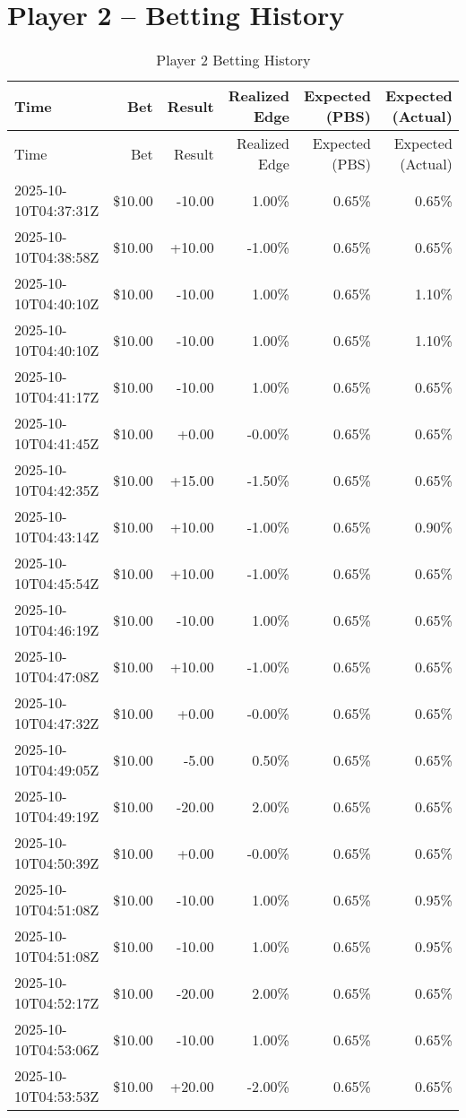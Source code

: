 \documentclass[11pt]{article}
\begin{document}
\section*{Player 2 -- Betting History}
\begin{longtable}{l | r | r | r | r | r}
\caption{Player 2 Betting History}\label{tab:history\_p2}\\
\hline
Time & Bet & Result & Realized Edge & Expected (PBS) & Expected (Actual) \\ \hline
\endfirsthead
\hline
Time & Bet & Result & Realized Edge & Expected (PBS) & Expected (Actual) \\ \hline
\endhead
2025-10-10T04:37:31Z & \$10.00 & -10.00 & 1.00\% & 0.65\% & 0.65\% \\
2025-10-10T04:38:58Z & \$10.00 & +10.00 & -1.00\% & 0.65\% & 0.65\% \\
2025-10-10T04:40:10Z & \$10.00 & -10.00 & 1.00\% & 0.65\% & 1.10\% \\
2025-10-10T04:40:10Z & \$10.00 & -10.00 & 1.00\% & 0.65\% & 1.10\% \\
2025-10-10T04:41:17Z & \$10.00 & -10.00 & 1.00\% & 0.65\% & 0.65\% \\
2025-10-10T04:41:45Z & \$10.00 & +0.00 & -0.00\% & 0.65\% & 0.65\% \\
2025-10-10T04:42:35Z & \$10.00 & +15.00 & -1.50\% & 0.65\% & 0.65\% \\
2025-10-10T04:43:14Z & \$10.00 & +10.00 & -1.00\% & 0.65\% & 0.90\% \\
2025-10-10T04:45:54Z & \$10.00 & +10.00 & -1.00\% & 0.65\% & 0.65\% \\
2025-10-10T04:46:19Z & \$10.00 & -10.00 & 1.00\% & 0.65\% & 0.65\% \\
2025-10-10T04:47:08Z & \$10.00 & +10.00 & -1.00\% & 0.65\% & 0.65\% \\
2025-10-10T04:47:32Z & \$10.00 & +0.00 & -0.00\% & 0.65\% & 0.65\% \\
2025-10-10T04:49:05Z & \$10.00 & -5.00 & 0.50\% & 0.65\% & 0.65\% \\
2025-10-10T04:49:19Z & \$10.00 & -20.00 & 2.00\% & 0.65\% & 0.65\% \\
2025-10-10T04:50:39Z & \$10.00 & +0.00 & -0.00\% & 0.65\% & 0.65\% \\
2025-10-10T04:51:08Z & \$10.00 & -10.00 & 1.00\% & 0.65\% & 0.95\% \\
2025-10-10T04:51:08Z & \$10.00 & -10.00 & 1.00\% & 0.65\% & 0.95\% \\
2025-10-10T04:52:17Z & \$10.00 & -20.00 & 2.00\% & 0.65\% & 0.65\% \\
2025-10-10T04:53:06Z & \$10.00 & -10.00 & 1.00\% & 0.65\% & 0.65\% \\
2025-10-10T04:53:53Z & \$10.00 & +20.00 & -2.00\% & 0.65\% & 0.65\% \\
\hline
\end{longtable}
\end{document}

